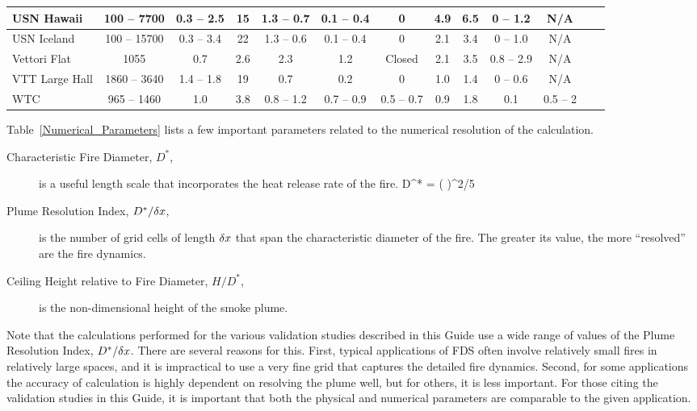 \begin{sidewaystable}[p]
\begin{center}
\begin{tabular}{|l|c|c|c|c|c|c|c|c|c|c|c|c|}
USN Hawaii          & 100 -- 7700   & 0.3 -- 2.5    & 15    & 1.3 -- 0.7        & 0.1 -- 0.4    & 0             & 4.9       & 6.5       & 0 -- 1.2          & N/A               \\ \hline
USN Iceland         & 100 -- 15700  & 0.3 -- 3.4    & 22    & 1.3 -- 0.6        & 0.1 -- 0.4    & 0             & 2.1       & 3.4       & 0 -- 1.0          & N/A               \\ \hline
Vettori Flat        & 1055          & 0.7           & 2.6   & 2.3               & 1.2           & Closed        & 2.1       & 3.5       & 0.8 -- 2.9        & N/A               \\ \hline
VTT Large Hall      & 1860 -- 3640  & 1.4 -- 1.8    & 19    & 0.7               & 0.2           & 0             & 1.0       & 1.4       & 0 -- 0.6          & N/A               \\ \hline
WTC                 & 965 -- 1460   & 1.0           & 3.8   & 0.8 -- 1.2        & 0.7 -- 0.9    & 0.5 -- 0.7    & 0.9       & 1.8       & 0.1               & 0.5 -- 2          \\ \hline
\end{tabular}
\end{center}
\label{Test_Parameters}
\nopagebreak
\end{sidewaystable}


\noindent
Table~\ref{Numerical_Parameters} lists a few important parameters related to the numerical resolution of the calculation.
\begin{description}
\item[Characteristic Fire Diameter, $D^*$,] is a useful length scale that incorporates the heat release rate of the fire.
\be D^* = \left(  \right)^{2/5}  \ee
\item[Plume Resolution Index, $D^*/\delta x$,] is the number of grid cells of length $\delta x$ that span the characteristic diameter of the fire. The greater its value, the more
``resolved'' are the fire dynamics.
\item[Ceiling Height relative to Fire Diameter, $H/D^*$,] is the non-dimensional height of the smoke plume.
\end{description}
Note that the calculations performed for the various validation studies described in this Guide use a wide range of values of the Plume Resolution Index, $D^*/\delta x$.
There are several reasons for this. First,
typical applications of FDS often involve relatively small fires in relatively large spaces, and it is impractical to use a very fine grid that captures the detailed fire dynamics.
Second, for some applications the accuracy of calculation is highly dependent on resolving the plume well, but for others, it is less important. For those citing the validation
studies in this Guide, it is important that both the physical and numerical parameters are comparable to the given application.


